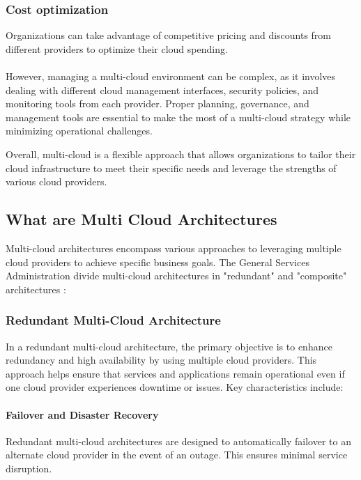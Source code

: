 \subsubsection{Cost optimization}
Organizations can take advantage of competitive pricing and 
discounts from different providers to optimize their cloud spending.\\
\\

However, managing a multi-cloud environment can be complex, as it involves dealing with different cloud management
interfaces, security policies, and monitoring tools from each provider. Proper planning, governance, and management tools are 
essential to make the most of a multi-cloud strategy while minimizing operational challenges.

Overall, multi-cloud is a flexible approach that allows organizations to tailor their cloud infrastructure to meet 
their specific needs and leverage the strengths of various cloud providers.

\subsection{What are Multi Cloud Architectures}


Multi-cloud architectures encompass various approaches to leveraging multiple cloud providers to achieve specific business goals. 
The General Services Administration\cite{MultiCloudHybridCloud} divide multi-cloud architectures in "redundant" and "composite" architectures :

\subsubsection{Redundant Multi-Cloud Architecture}

In a redundant multi-cloud architecture, the primary objective is to enhance redundancy and high availability by using multiple cloud providers. 
This approach helps ensure that services and applications remain operational even if one cloud provider experiences downtime or issues. 
Key characteristics include:

\paragraph{Failover and Disaster Recovery}
Redundant multi-cloud architectures are designed to automatically failover to an alternate cloud provider in the event of an outage. 
This ensures minimal service disruption.

